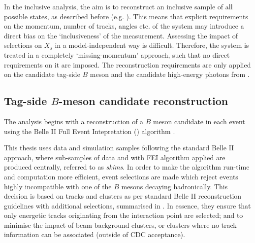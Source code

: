 
In the inclusive \BtoXsgamma analysis, the aim is to reconstruct an inclusive sample of all possible \Xs states, 
as described before (e.g. ).
This means that explicit requirements on the momentum, number of tracks, angles etc. of the \Xs system may introduce a direct bias on the `inclusiveness' of the measurement.
Assessing the impact of selections on $X_s$ in a model-independent way is difficult.
Therefore, the \Xs system is treated in a completely `missing-momentum' approach, such that no direct requirements on it are imposed.
The reconstruction requirements are only applied on the candidate tag-side $B$ meson and the candidate high-energy photons from \BtoXsgamma.
\subsection{Tag-side \texorpdfstring{$B$}{B}-meson candidate reconstruction}\label{sec:tag_reconstruction}

The analysis begins with a reconstruction of a $B$ meson candidate in each event using the Belle II Full Event Intepretation (\FEI) algorithm \cite{Keck:2017mui,Keck:2018lcd}.

This thesis uses data and simulation samples following the standard Belle II approach, where sub-samples of data and \MC with FEI algorithm applied are produced centrally, referred to as \textit{\FEI skims}.
In order to make the \FEI algorithm run-time and computation more efficient, event selections are made which reject events highly incompatible with one of the $B$ mesons decaying hadronically.
This decision is based on tracks and clusters as per standard Belle II reconstruction guidelines with additional selections, summarised in .
In essence, they ensure that only energetic tracks originating from the interaction point are selected;
and to minimise the impact of beam-background clusters, or clusters where no track information can be associated (outside of CDC acceptance).

\begin{table}[htbp!]
    \centering
     \caption{\label{tab:fei_objects} Definitions for \FEI event pre-selection.}
\end{table}

